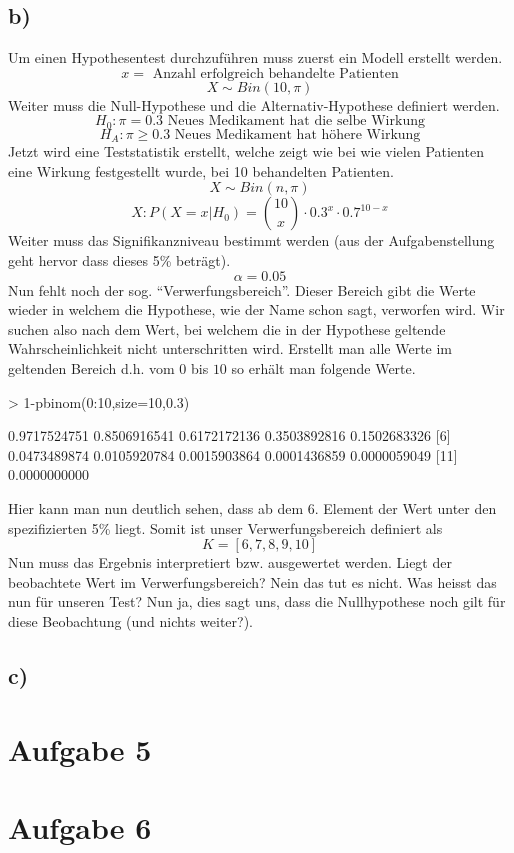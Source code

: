 \subsection*{b)}
Um einen Hypothesentest durchzuführen muss zuerst ein Modell erstellt werden.
\[ x = \text{ Anzahl erfolgreich behandelte Patienten}\]
\[ X \sim Bin(10,\pi) \]
Weiter muss die Null-Hypothese
und die Alternativ-Hypothese definiert werden.
\[ H_0: \pi = 0.3 \text{ Neues Medikament hat die selbe Wirkung} \]
\[ H_A: \pi \geq 0.3 \text{ Neues Medikament hat höhere Wirkung} \]
Jetzt wird eine Teststatistik erstellt, welche zeigt wie bei wie vielen
Patienten eine Wirkung festgestellt wurde, bei 10 behandelten Patienten.
\[ X \sim Bin(n,\pi)  \]
\[ X: P(X=x|H_0) = {10 \choose x} \cdot 0.3^x \cdot 0.7^{10-x} \]
Weiter muss das Signifikanzniveau bestimmt werden (aus der Aufgabenstellung
geht hervor dass dieses 5\% beträgt).
\[ \alpha = 0.05 \]
Nun fehlt noch der sog. ``Verwerfungsbereich''. Dieser Bereich gibt die
Werte wieder in welchem die Hypothese, wie der Name schon sagt, verworfen
wird. Wir suchen also nach dem Wert, bei welchem die in der Hypothese geltende
Wahrscheinlichkeit nicht unterschritten wird. Erstellt man alle Werte im
geltenden Bereich d.h. vom $0$ bis $10$ so erhält man folgende Werte.
\begin{Schunk}
\begin{Sinput}
> 1-pbinom(0:10,size=10,0.3)
\end{Sinput}
\begin{Soutput}
 [1] 0.9717524751 0.8506916541 0.6172172136 0.3503892816 0.1502683326
 [6] 0.0473489874 0.0105920784 0.0015903864 0.0001436859 0.0000059049
[11] 0.0000000000
\end{Soutput}
\end{Schunk}
Hier kann man nun deutlich sehen, dass ab dem 6. Element der Wert unter 
den spezifizierten 5\% liegt. Somit ist unser Verwerfungsbereich definiert als
\[ K = [6,7,8,9,10] \]
Nun muss das Ergebnis interpretiert bzw. ausgewertet werden. Liegt der
beobachtete Wert im Verwerfungsbereich? Nein das tut es nicht.
Was heisst das nun für unseren Test? Nun ja, dies sagt uns, dass die
Nullhypothese noch gilt für diese Beobachtung (und nichts weiter?).


\subsection*{c)}

\section{Aufgabe 5}
\section{Aufgabe 6}
